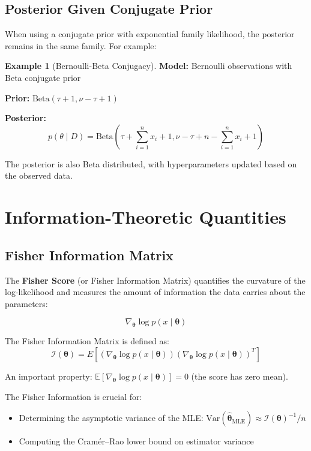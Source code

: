 \documentclass[12pt,a4paper]{article}
\theoremstyle{definition}
\newtheorem{example}{Example}[section]
\begin{document}
\subsection{Posterior Given Conjugate Prior}

When using a conjugate prior with exponential family likelihood, the posterior remains in the same family. For example:

\begin{example}[Bernoulli-Beta Conjugacy]
\textbf{Model:} Bernoulli observations with Beta conjugate prior

\textbf{Prior:} $\text{Beta}(\tau + 1, \nu - \tau + 1)$

\textbf{Posterior:} 
\[
p(\theta \mid D) = \text{Beta}\left(\tau + \sum_{i=1}^n x_i + 1, \nu - \tau + n - \sum_{i=1}^n x_i + 1\right)
\]

The posterior is also Beta distributed, with hyperparameters updated based on the observed data.
\end{example}

\section{Information-Theoretic Quantities}

\subsection{Fisher Information Matrix}

The \textbf{Fisher Score} (or Fisher Information Matrix) quantifies the curvature of the log-likelihood and measures the amount of information the data carries about the parameters:

\[
\nabla_{\boldsymbol{\theta}} \log p(x \mid \boldsymbol{\theta})
\]

The Fisher Information Matrix is defined as:
\[
\mathcal{I}(\boldsymbol{\theta}) = E\left[\left(\nabla_{\boldsymbol{\theta}} \log p(x \mid \boldsymbol{\theta})\right) \left(\nabla_{\boldsymbol{\theta}} \log p(x \mid \boldsymbol{\theta})\right)^T\right]
\]

An important property: $\mathbb{E}[\nabla_{\boldsymbol{\theta}} \log p(x \mid \boldsymbol{\theta})] = 0$ (the score has zero mean).

The Fisher Information is crucial for:
\begin{itemize}
    \item Determining the asymptotic variance of the MLE: $\text{Var}(\hat{\boldsymbol{\theta}}_{\text{MLE}}) \approx \mathcal{I}(\boldsymbol{\theta})^{-1} / n$
    \item Computing the Cramér--Rao lower bound on estimator variance
\end{itemize}
\end{document}
